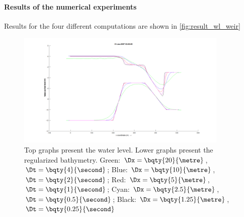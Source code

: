 \paragraph*{Results of the numerical experiments}
Results for the four different computations are shown in \autoref{fig:result_wl_weir}
\begin{figure}[H]
    \centering
    \includegraphics[width=0.9\textwidth]{figures/weir_bed_water_level.pdf}
    \caption[Weir experiment: water level and bed level]{Top graphs present the water level. Lower graphs present the regularized bathymetry.
    Green: $\Dx = \bqty{20}{\metre}$, $\Dt = \bqty{4}{\second}$;
    Blue: $\Dx = \bqty{10}{\metre}$, $\Dt = \bqty{2}{\second}$;
    Red: $\Dx = \bqty{5}{\metre}$, $\Dt = \bqty{1}{\second}$;
    Cyan: $\Dx = \bqty{2.5}{\metre}$, $\Dt = \bqty{0.5}{\second}$;
    Black: $\Dx = \bqty{1.25}{\metre}$, $\Dt =\bqty{0.25}{\second}$
    }
    \label{fig:result_wl_weir}
\end{figure}
%
